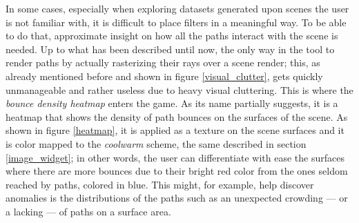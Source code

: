 In some cases, especially when exploring datasets generated upon scenes the user is not familiar with, it is difficult to place filters in a meaningful way. To be able to do that, approximate insight on how all the paths interact with the scene is needed. Up to what has been described until now, the only way in the tool to render paths by actually rasterizing their rays over a scene render; this, as already mentioned before and shown in figure \ref{visual_clutter}, gets quickly unmanageable and rather useless due to heavy visual cluttering.
This is where the \textit{bounce density heatmap} enters the game. As its name partially suggests, it is a heatmap that shows the density of path bounces on the surfaces of the scene. As shown in figure \ref{heatmap}, it is applied as a texture on the scene surfaces and it is color mapped to the \textit{coolwarm} scheme, the same described in section \ref{image_widget}; in other words, the user can differentiate with ease the surfaces where there are more bounces due to their bright red color from the ones seldom reached by paths, colored in blue. This might, for example, help discover anomalies is the distributions of the paths such as an unexpected crowding --- or a lacking --- of paths on a surface area. 


